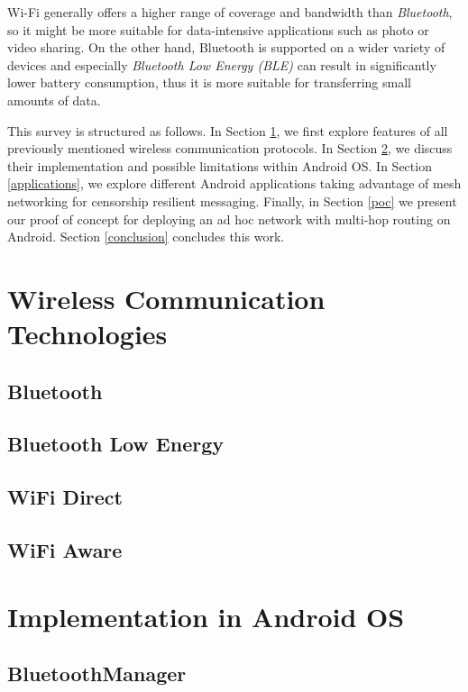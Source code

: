 \documentclass[conference,compsoc]{IEEEtran}
\begin{document}
Wi-Fi generally offers a higher range of coverage and bandwidth than \textit{Bluetooth}, so it might be more suitable for data-intensive applications such as photo or video sharing. On the other hand, Bluetooth is supported on a wider variety of devices and especially \textit{Bluetooth Low Energy (BLE)} \cite{android:ble} can result in significantly lower battery consumption, thus it is more suitable for transferring small amounts of data.

This survey is structured as follows. In Section \ref{wirelesstech}, we first explore features of all previously mentioned wireless communication protocols. In Section \ref{android}, we discuss their implementation and possible limitations within Android OS. In Section \ref{applications}, we explore different Android applications taking advantage of mesh networking for censorship resilient messaging. Finally, in Section \ref{poc} we present our proof of concept for deploying an ad hoc network with multi-hop routing on Android. Section \ref{conclusion} concludes this work.

\section{Wireless Communication Technologies} \label{wirelesstech}

\subsection{Bluetooth}


\subsection{Bluetooth Low Energy}
\subsection{WiFi Direct}
\subsection{WiFi Aware}

\section{Implementation in Android OS} \label{android}
\subsection{BluetoothManager}
\end{document}
